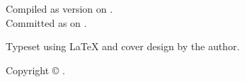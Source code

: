 {  Compiled as version \compileCounterText{} on \currentTimeLong{}.\\
  Committed as \gitCommitText{} on \gitCommitTimeLong{}.
  
  \vspace{1em}
  
  Typeset using \LaTeX{} and cover design by the author.
  
  Copyright \copyright{} \theyear{} \theauthor{}.
  
  \vspace{1em}
  
}

\cleardoublepage
